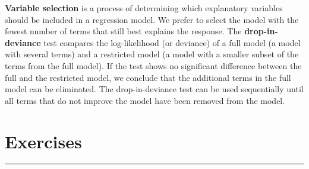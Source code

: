 \documentclass[
]{report}
\newcounter{excount}
\begin{document}
\textbf{Variable selection} is a process of determining which explanatory variables should be included in a regression model. We prefer to select the model with the fewest number of terms that still best explains the response. The \textbf{drop-in-deviance} test compares the log-likelihood (or deviance) of a full model (a model with several terms) and a restricted model (a model with a smaller subset of the terms from the full model). If the test shows no significant difference between the full and the restricted model, we conclude that the additional terms in the full model can be eliminated. The drop-in-deviance test can be used sequentially until all terms that do not improve the model have been removed from the model.

\hypertarget{exercises-6}{%
\section*{\texorpdfstring{\textbf{Exercises}}{Exercises}}\label{exercises-6}}

\vspace{-2em}

\noindent

\rule{\linewidth}{0.4pt}

\setcounter{excount}{0}
\end{document}
